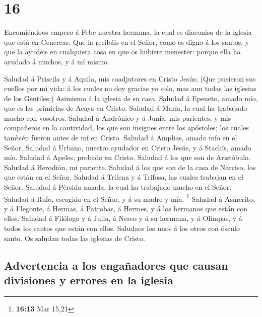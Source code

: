 \hypertarget{section-15}{%
\section{16}\label{section-15}}

 Encomiéndoos empero á Febe nuestra hermana, la cual es
diaconisa de la iglesia que está en Cencreas:  Que la
recibáis en el Señor, como es digno á los santos, y que la ayudéis en
cualquiera cosa en que os hubiere menester: porque ella ha ayudado á
muchos, y á mí mismo.

 Saludad á Priscila y á Aquila, mis coadjutores en Cristo
Jesús;  (Que pusieron sus cuellos por mi vida: á los cuales
no doy gracias yo solo, mas aun todas las iglesias de los Gentiles;)
 Asimismo á la iglesia de su casa. Saludad á Epeneto, amado
mío, que es las primicias de Acaya en Cristo.  Saludad á
María, la cual ha trabajado mucho con vosotros.  Saludad á
Andrónico y á Junia, mis parientes, y mis compañeros en la cautividad,
los que son insignes entre los apóstoles; los cuales también fueron
antes de mí en Cristo.  Saludad á Amplias, amado mío en el
Señor.  Saludad á Urbano, nuestro ayudador en Cristo Jesús,
y á Stachîs, amado mío.  Saludad á Apeles, probado en
Cristo. Saludad á los que son de Aristóbulo.  Saludad á
Herodión, mi pariente. Saludad á los que son de la casa de Narciso, los
que están en el Señor.  Saludad á Trifena y á Trifosa, las
cuales trabajan en el Señor. Saludad á Pérsida amada, la cual ha
trabajado mucho en el Señor.  Saludad á Rufo, escogido en
el Señor, y á su madre y mía. \footnote{\textbf{16:13} Mar 15,21}
 Saludad á Asíncrito, y á Flegonte, á Hermas, á Patrobas, á
Hermes, y á los hermanos que están con ellos.  Saludad á
Filólogo y á Julia, á Nereo y á su hermana, y á Olimpas, y á todos los
santos que están con ellos.  Saludaos los unos á los otros
con ósculo santo. Os saludan todas las iglesias de Cristo.

\hypertarget{advertencia-a-los-engauxf1adores-que-causan-divisiones-y-errores-en-la-iglesia}{%
\subsection{Advertencia a los engañadores que causan divisiones y
errores en la
iglesia}\label{advertencia-a-los-engauxf1adores-que-causan-divisiones-y-errores-en-la-iglesia}}

